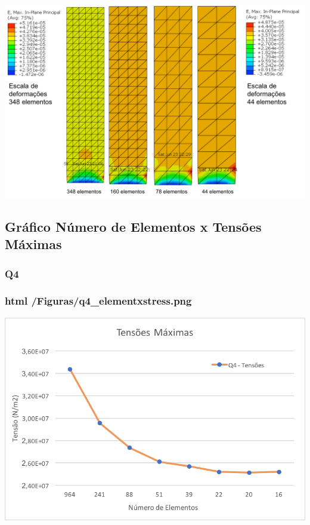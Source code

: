 \begin{DoxyImageNoCaption}
  \mbox{\includegraphics[width=\textwidth,height=\textheight/2,keepaspectratio=true]{strain_t6.png}}
\end{DoxyImageNoCaption}
 

\subsection*{Gráfico Número de Elementos x Tensões Máximas}

\subsubsection*{Q4}

\subsubsection*{html /\+Figuras/q4\+\_\+elementxstress.png}


\begin{DoxyImageNoCaption}
  \mbox{\includegraphics[width=\textwidth,height=\textheight/2,keepaspectratio=true]{q4_elementxstress.png}}
\end{DoxyImageNoCaption}
 

